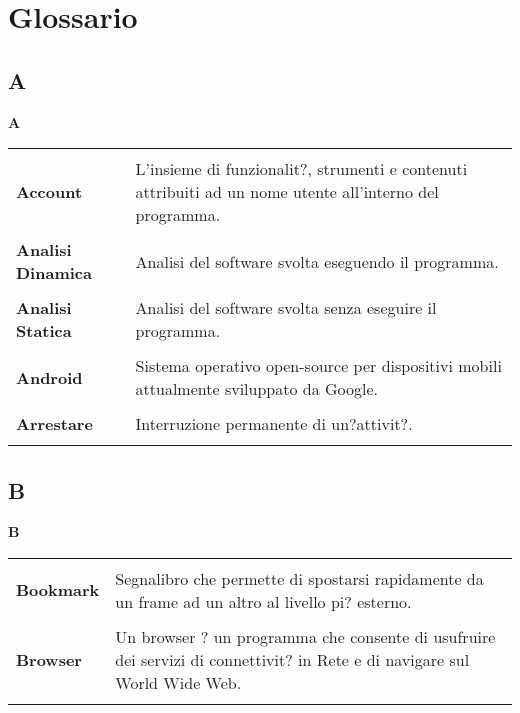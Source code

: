 \section{Glossario}{ 
\subsection{A} 
\hfill\Huge{\textbf{A}} \\ 
\normalsize 
\begin{longtabu} to 
\toprule \\ 
\textbf{Account} & L'insieme di funzionalit?, strumenti e contenuti attribuiti ad un nome utente all'interno del programma. \\ 
 \\ 
\textbf{Analisi Dinamica} & Analisi del software svolta eseguendo il programma. \\ 
 \\ 
\textbf{Analisi Statica} & Analisi del software svolta senza eseguire il programma. \\ 
 \\ 
\textbf{Android} & Sistema operativo open-source per dispositivi mobili attualmente sviluppato da Google. \\ 
 \\ 
\textbf{Arrestare} & Interruzione permanente di un?attivit?. \\ 
 \\ 
\end{longtabu} 
\newpage 
\subsection{B} 
\hfill\Huge{\textbf{B}} \\ 
\normalsize 
\begin{longtabu} to 
\toprule \\ 
\textbf{Bookmark} & Segnalibro che permette di spostarsi rapidamente da un frame ad un altro al livello pi? esterno. \\ 
 \\ 
\textbf{Browser} & Un browser ? un programma che consente di usufruire dei servizi di connettivit? in Rete e di navigare sul World Wide Web. \\ 
 \\ 
\end{longtabu} 
\newpage 
}
